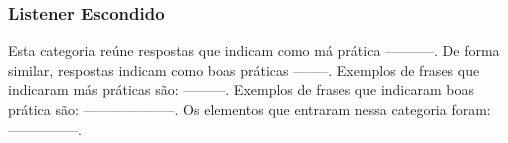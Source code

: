 \subsubsection{Listener Escondido}
Esta categoria re\'une respostas que indicam como m\'a pr\'atica -----------. De forma similar, respostas indicam como boas pr\'aticas --------. Exemplos de frases que indicaram m\'as pr\'aticas s\~ao: ---------. Exemplos de frases que indicaram boas pr\'atica s\~ao: --------------------. Os elementos que entraram nessa categoria foram: ---------------. 










